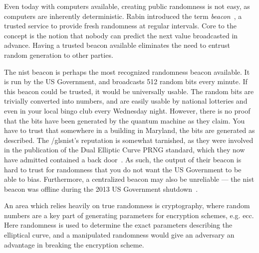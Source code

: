 Even today with computers available, creating public randomness is not easy, as computers are inherently deterministic. Rabin introduced the term \emph{beacon}~\cite{rabin1983transaction}, a trusted service to provide fresh randomness at regular intervals. Core to the concept is the notion that nobody can predict the next value broadcasted in advance. Having a trusted beacon available eliminates the need to entrust random generation to other parties. 

The \gls{nist} beacon is perhaps the most recognized randomness beacon available.
It is run by the US Government, and broadcasts 512 random bits every minute.
If this beacon could be trusted, it would be universally usable. The random bits are trivially converted into numbers, and are easily usable by national lotteries and even in your local bingo club every Wednesday night.
However, there is no proof that the bits have been generated by the quantum machine as they claim. You have to trust that somewhere in a building in Maryland, the bits are generated as described.
The /gls{nist}'s reputation is somewhat tarnished, as they were involved in the publication of the Dual Elliptic Curve PRNG standard, which they now have admitted contained a back door~\cite{nist2014backdoor}. As such, the output of their beacon is hard to trust for randomness that you do not want the US Government to be able to bias. 
Furthermore, a centralized beacon may also be unreliable --- the \gls{nist} beacon was offline during the 2013 US Government shutdown~\cite{bonneau2015bitcoin}.

An area which relies heavily on true randomness is cryptography, where random numbers are a key part of generating parameters for encryption schemes, e.g. \gls{ecc}.
Here randomness is used to determine the exact parameters describing the elliptical curve, and a manipulated randomness would give an adversary an advantage in breaking the encryption scheme.


